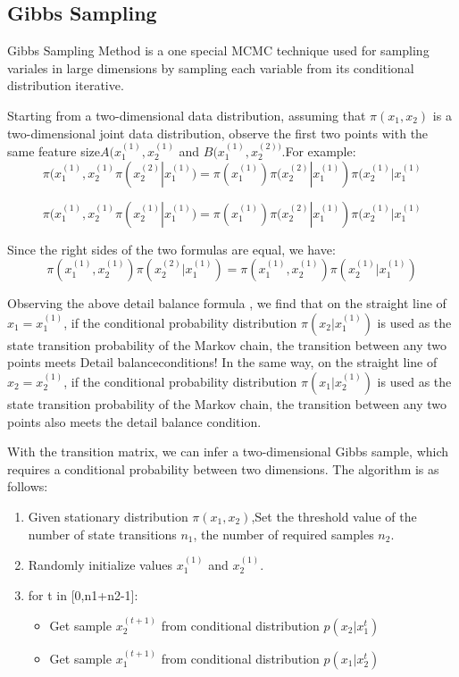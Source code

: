 \subsection{Gibbs Sampling}
Gibbs Sampling Method is a one special MCMC technique used for sampling variales in large dimensions by sampling each variable from its conditional distribution iterative.

Starting from a two-dimensional data distribution, assuming that $\pi(x_1,x_2)$ is a two-dimensional joint data distribution, observe the first two points with the same feature size$A(x_1^{(1)},x_2^{(1)}$ and $B(x_1^{(1)},x_2^{(2))}$.For example:
\[
  \pi(x_1^{(1)},x_2^{(1)}\pi(x_2^{(2)}|x_1^{(1)}) = \pi(x_1^{(1)})\pi(x_2^{(2)}|x_1^{(1)})\pi(x_2^{(1)}|x_1^{(1)}
\]

\[
  \pi(x_1^{(1)},x_2^{(1)}\pi(x_2^{(1)}|x_1^{(1)}) = \pi(x_1^{(1)})\pi(x_2^{(2)}|x_1^{(1)})\pi(x_2^{(1)}|x_1^{(1)}
\]

Since the right sides of the two formulas are equal, we have:
\[
  \pi(x_1^{(1)},x_2^{(1)})\pi(x_2^{(2)}|x_1^{(1)}) =   \pi(x_1^{(1)},x_2^{(1)})\pi(x_2^{(1)}|x_1^{(1)})
\]

Observing the above detail balance formula , we find that on the straight line of $x_1 = x_1^{(1)}$, if the conditional probability distribution $\pi(x_2|x_1^{(1)})$ is used as the state transition probability of the Markov chain, the transition between any two points meets Detail balanceconditions! In the same way, on the straight line of $x_2 = x_2^{(1)}$, if the conditional probability distribution $\pi(x_1|x_2^{(1)})$  is used as the state transition probability of the Markov chain, the transition between any two points also meets the detail balance condition.


With the  transition matrix, we can infer a two-dimensional Gibbs sample, which requires a conditional probability between two dimensions. The algorithm is as follows:
\begin{enumerate}
  \item Given stationary distribution $\pi(x_1,x_2)$,Set the threshold value of the number of state transitions $n_1$, the number of required samples $n_2$.
  \item Randomly initialize values $x_1^{(1)}$ and $x_2^{(1)}$.
  \item for t in [0,n1+n2-1]:
      \begin{itemize}
        \item Get sample $x_2^{(t+1)}$ from conditional distribution $p(x_2|x_1^t)$
        \item Get sample $x_1^{(t+1)}$ from conditional distribution $p(x_1|x_2^t)$
      \end{itemize}
\end{enumerate}
